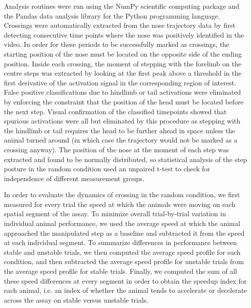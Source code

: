 Analysis routines were run using the NumPy scientific computing package \cite{Walt2011} and the Pandas data analysis library \cite{McKinney2010} for the Python programming language. Crossings were automatically extracted from the nose trajectory data by first detecting consecutive time points where the nose was positively identified in the video. In order for these periods to be successfully marked as crossings, the starting position of the nose must be located on the opposite side of the ending position. Inside each crossing, the moment of stepping with the forelimb on the centre steps was extracted by looking at the first peak above a threshold in the first derivative of the activation signal in the corresponding region of interest. False positive classifications due to hindlimb or tail activations were eliminated by enforcing the constraint that the position of the head must be located before the next step. Visual confirmation of the classified timepoints showed that spurious activations were all but eliminated by this procedure as stepping with the hindlimb or tail requires the head to be further ahead in space unless the animal turned around (in which case the trajectory would not be marked as a crossing anyway). The position of the nose at the moment of each step was extracted and found to be normally distributed, so statistical analysis of the step posture in the random condition used an unpaired t-test to check for independence of different measurement groups.

In order to evaluate the dynamics of crossing in the random condition, we first measured for every trial the speed at which the animals were moving on each spatial segment of the assay. To minimize overall trial-by-trial variation in individual animal performance, we used the average speed at which the animal approached the manipulated step as a baseline and subtracted it from the speed at each individual segment. To summarize differences in performance between stable and unstable trials, we then computed the average speed profile for each condition, and then subtracted the average speed profile for unstable trials from the average speed profile for stable trials. Finally, we computed the sum of all these speed differences at every segment in order to obtain the speedup index for each animal, i.e. an index of whether the animal tends to accelerate or decelerate across the assay on stable versus unstable trials.

